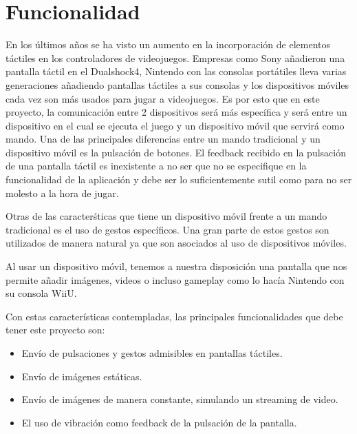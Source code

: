 \section{Funcionalidad}

En los \'ultimos a\~nos se ha visto un aumento en la incorporaci\'on de elementos t\'actiles en los controladores de videojuegos. Empresas como Sony a\~nadieron una pantalla t\'actil en el Dualshock4, Nintendo con las consolas port\'atiles lleva varias generaciones a\~nadiendo pantallas t\'actiles a sus consolas y los dispositivos m\'oviles cada vez son m\'as usados para jugar a videojuegos.
Es por esto que en este proyecto, la comunicaci\'on entre 2 dispositivos ser\'a m\'as espec\'ifica y ser\'a entre un dispositivo en el cual se ejecuta el juego y un dispositivo m\'ovil que servir\'a como mando. Una de las principales diferencias entre un mando tradicional y un dispositivo m\'ovil es la pulsaci\'on de botones. El feedback recibido en la pulsaci\'on de una pantalla t\'actil es inexistente a no ser que no se especifique en la funcionalidad de la aplicaci\'on y debe ser lo suficientemente sutil como para no ser molesto a la hora de jugar.

Otras de las caracter\'sticas que tiene un dispositivo m\'ovil frente a un mando tradicional es el uso de gestos espec\'ificos. Una gran parte de estos gestos son utilizados de manera natural ya que son asociados al uso de dispositivos m\'oviles. 

Al usar un dispositivo m\'ovil, tenemos a nuestra disposici\'on una pantalla que nos permite a\~nadir im\'agenes, videos o incluso gameplay como lo hac\'ia Nintendo con su consola WiiU.

Con estas caracter\'isticas contempladas, las principales funcionalidades que debe tener este proyecto son:

\begin {itemize}
\item Env\'io de pulsaciones y gestos admisibles en pantallas t\'actiles.
\item Env\'io de im\'agenes est\'aticas.
\item Env\'io de im\'agenes de manera constante, simulando un streaming de video.
\item El uso de vibraci\'on como feedback de la pulsaci\'on de la pantalla.
\end {itemize}

